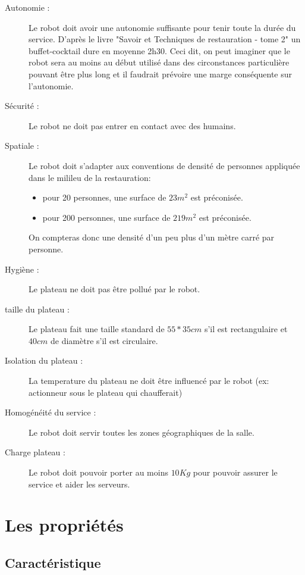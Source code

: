 \begin{description}
\item[Autonomie :] Le robot doit avoir une autonomie suffisante pour
  tenir toute la durée du service. D'après le livre "Savoir et
  Techniques de restauration - tome 2" un buffet-cocktail dure en
  moyenne 2h30. Ceci dit, on peut imaginer que le robot sera au moins
  au début utilisé dans des circonstances particulière pouvant être
  plus long et il faudrait prévoire une marge conséquente sur
  l'autonomie.
\item[Sécurité :] Le robot ne doit pas entrer en contact avec des humains.
\item[Spatiale :] Le robot doit s'adapter aux conventions de densité
  de personnes appliquée dans le milileu de la restauration:
  \begin{itemize}
  \item pour 20 personnes, une surface de $23m^2$ est préconisée.
  \item pour 200 personnes, une surface de $219m^2$ est préconisée.
  \end{itemize}
  On compteras donc une densité d'un peu plus d'un mètre carré par
  personne.
\item[Hygiène :] Le plateau ne doit pas être pollué par le robot.
\item[taille du plateau :] Le plateau fait une taille standard de
  $55*35cm$ s'il est rectangulaire et $40cm$ de diamètre s'il est
  circulaire.
\item[Isolation du plateau :] La temperature du plateau ne doit être
  influencé par le robot (ex: actionneur sous le plateau qui
  chaufferait)
\item[Homogénéité du service :] Le robot doit servir toutes les zones
  géographiques de la salle.
\item[Charge plateau :] Le robot doit pouvoir porter au moins $10Kg$
  pour pouvoir assurer le service et aider les serveurs.

\end{description}

\section{Les propriétés}
\subsection{Caractéristique}
